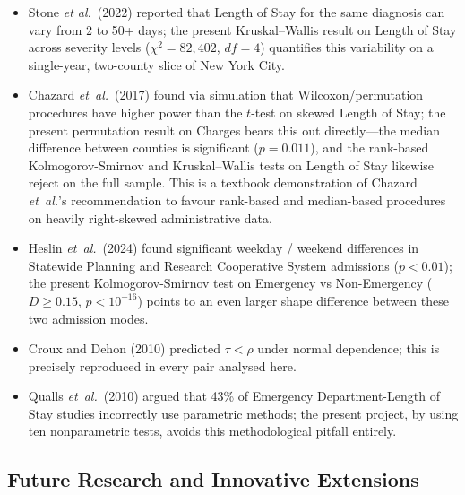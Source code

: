 \documentclass[12pt]{article}
\begin{document}
\begin{itemize}[nosep]
  \item Stone \emph{et al.}\ (2022) reported that Length of Stay for the same
    diagnosis can vary from 2 to 50+ days; the present
    Kruskal--Wallis result on Length of Stay across severity levels
    ($\chi^2=82{,}402$, $df=4$) quantifies this variability on a
    single-year, two-county slice of New York City.
  \item Chazard \emph{et~al.}\ (2017) found via simulation that
    Wilcoxon/permutation procedures have higher power than the
    $t$-test on skewed Length of Stay; the present permutation result
    on Charges bears this out directly---the median difference between
    counties is significant ($p=0.011$), and the rank-based
    Kolmogorov-Smirnov and Kruskal--Wallis tests on Length of Stay
    likewise reject on the full sample. This is a textbook
    demonstration of Chazard \emph{et~al.}'s recommendation to favour
    rank-based and median-based procedures on heavily right-skewed
    administrative data.
  \item Heslin \emph{et~al.}\ (2024) found significant weekday /
    weekend differences in Statewide Planning and Research Cooperative System admissions ($p<0.01$); the present
    Kolmogorov-Smirnov test on Emergency vs Non-Emergency ($D\ge 0.15$, $p<10^{-16}$)
    points to an even larger shape difference between these two
    admission modes.
  \item Croux and Dehon (2010) predicted $\tau<\rho$ under normal
    dependence; this is precisely reproduced in every pair analysed here.
  \item Qualls \emph{et~al.}\ (2010) argued that 43\% of Emergency Department-Length of Stay
    studies incorrectly use parametric methods; the present project,
    by using ten nonparametric tests, avoids this methodological
    pitfall entirely.
\end{itemize}

\subsection{Future Research and Innovative Extensions}
\end{document}
